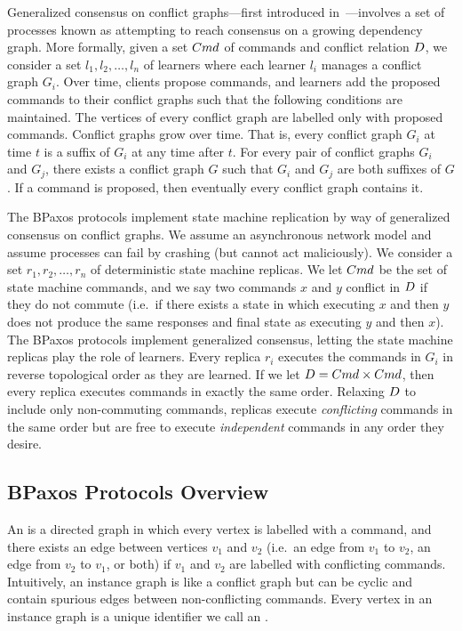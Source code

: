 Generalized consensus on conflict graphs---first introduced
in~\cite{lamport1998part}---involves a set of processes known as
 attempting to reach consensus on a growing dependency graph.
More formally, given a set $Cmd$ of commands and conflict relation
$D$, we consider a set $l_1, l_2, \ldots, l_n$ of learners where each
learner $l_i$ manages a conflict graph $G_i$. Over time, clients propose
commands, and learners add the proposed commands to their conflict graphs such
that the following conditions are maintained.
%
  The vertices of every conflict graph are labelled only with proposed
  commands.
%
  Conflict graphs grow over time. That is, every conflict graph $G_i$ at time
  $t$ is a suffix of $G_i$ at any time after $t$.
%
  For every pair of conflict graphs $G_i$ and $G_j$, there exists a conflict
  graph $G$ such that $G_i$ and $G_j$ are both suffixes of $G$.
%
  If a command is proposed, then eventually every conflict graph contains it.

The BPaxos protocols implement state machine replication by way of generalized
consensus on conflict graphs. We assume an asynchronous network model and
assume processes can fail by crashing (but cannot act maliciously). We consider
a set $r_1, r_2, \ldots, r_n$ of deterministic state machine replicas. We let
$Cmd$ be the set of state machine commands, and we say two commands $x$ and
$y$ conflict in $D$ if they do not commute (i.e.\ if there exists a
state in which executing $x$ and then $y$ does not produce the same responses
and final state as executing $y$ and then $x$). The BPaxos protocols implement
generalized consensus, letting the state machine replicas play the role of
learners. Every replica $r_i$ executes the commands in $G_i$ in reverse
topological order as they are learned. If we let $D = Cmd \times
Cmd$, then every replica executes commands in exactly the same order. Relaxing
$D$ to include only non-commuting commands, replicas execute
\emph{conflicting} commands in the same order but are free to execute
\emph{independent} commands in any order they desire.

\subsection{BPaxos Protocols Overview}
An  is a directed graph in which every vertex is
labelled with a command, and there exists an edge between vertices $v_1$ and
$v_2$ (i.e.\ an edge from $v_1$ to $v_2$, an edge from $v_2$ to $v_1$, or both)
if $v_1$ and $v_2$ are labelled with conflicting commands. Intuitively, an
instance graph is like a conflict graph but can be cyclic and contain spurious
edges between non-conflicting commands. Every vertex in an instance graph is a
unique identifier we call an .

